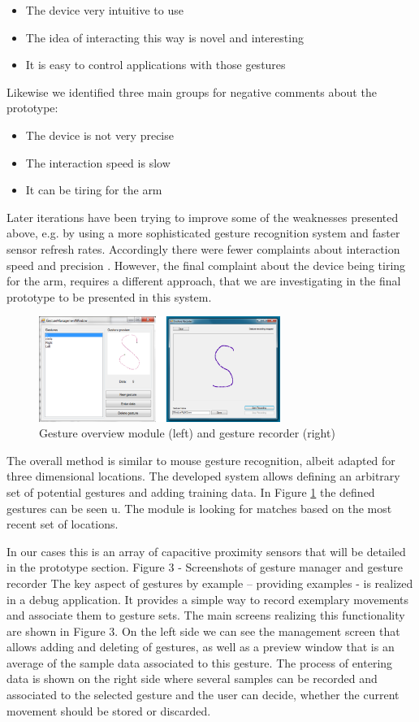 \begin{itemize}
\item{The device very intuitive to use}
\item{The idea of interacting this way is novel and interesting}
\item{It is easy to control applications with those gestures}
\end{itemize}
Likewise we identified three main groups for negative comments about the prototype:
\begin{itemize}
\item{The device is not very precise}
\item{The interaction speed is slow}
\item{It can be tiring for the arm}
\end{itemize}
Later iterations have been trying to improve some of the weaknesses presented above, e.g. by using a more sophisticated gesture recognition system and faster sensor refresh rates. Accordingly there were fewer complaints about interaction speed and precision \cite{braun2013capacitive}. However, the final complaint about the device being tiring for the arm, requires a different approach, that we are investigating in the final prototype to be presented in this system.

\begin{figure}[h]
\centering
\includegraphics[width=0.7\textwidth]{images/magicbox_data_gest}
\caption{Gesture overview module (left) and gesture recorder (right) \cite{braun2013capacitive}}
\label{fig:magicbox_data_gest}
\end{figure}
The overall method is similar to mouse gesture recognition, albeit adapted for three dimensional locations. The developed system allows defining an arbitrary set of potential gestures and adding training data. In Figure \ref{fig:magicbox_data_gest} the defined gestures can be seen u. The module is looking for matches based on the most recent set of locations. 

In our cases this is an array of capacitive proximity sensors that will be detailed in the prototype section.
Figure 3 - Screenshots of gesture manager and gesture
recorder
The key aspect of gestures by example – providing examples - is realized in a debug application. It provides a simple way to record exemplary movements and associate them to gesture sets. The main screens realizing this functionality are shown in Figure 3.
On the left side we can see the management screen that allows
adding and deleting of gestures, as well as a preview window that is an average of the sample data associated to this gesture. The process of entering data is shown on the right side where several samples can be recorded and associated to the selected gesture and the user can decide, whether the current movement should be stored or discarded.
